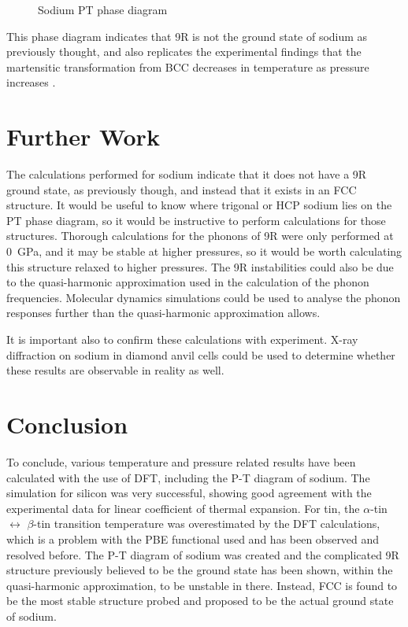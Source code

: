 \documentclass[12pt]{article}
\begin{document}
\begin{figure}
	\centering
	
	\caption{Sodium PT phase diagram}
	\label{fig:na_phase_diagram}
\end{figure}

This phase diagram indicates that 9R is not the ground state of sodium as previously thought, and also replicates the experimental findings that the martensitic transformation from BCC decreases in temperature as pressure increases \cite{smith1991pressure}.
\section{Further Work}
The calculations performed for sodium indicate that it does not have a 9R ground state, as previously though, and instead that it exists in an FCC structure. 
It would be useful to know where trigonal or HCP sodium lies on the PT phase diagram, so it would be instructive to perform calculations for those structures.
Thorough calculations for the phonons of 9R were only performed at \SI{0}{\giga\pascal}, and it may be stable at higher pressures, so it would be worth calculating this structure relaxed to higher pressures.
The 9R instabilities could also be due to the quasi-harmonic approximation used in the calculation of the phonon frequencies. Molecular dynamics simulations could be used to analyse the phonon responses further than the quasi-harmonic approximation allows.

It is important also to confirm these calculations with experiment. X-ray diffraction on sodium in diamond anvil cells could be used to determine whether these results are observable in reality as well.

\section{Conclusion}
To conclude, various temperature and pressure related results have been calculated with the use of DFT, including the P-T diagram of sodium. The simulation for silicon was very successful, showing good agreement with the experimental data for linear coefficient of thermal expansion. For tin, the $\alpha$-tin $\leftrightarrow$ $\beta$-tin transition temperature was overestimated by the DFT calculations, which is a problem with the PBE functional used and has been observed and resolved before.
The P-T diagram of sodium was created and the complicated 9R structure previously believed to be the ground state has been shown, within the quasi-harmonic approximation, to be unstable in there. 
Instead, FCC is found to be the most stable structure probed and proposed to be the actual ground state of sodium.
\end{document}
